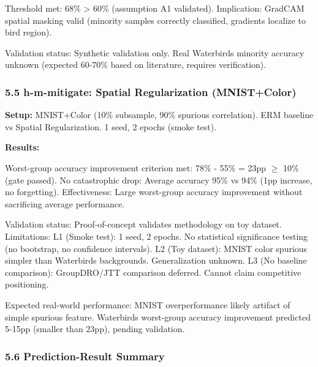 Threshold met: 68\% > 60\% (assumption A1 validated). Implication: GradCAM spatial masking valid (minority samples correctly classified, gradients localize to bird region).

Validation status: Synthetic validation only. Real Waterbirds minority accuracy unknown (expected 60-70\% based on literature, requires verification).

\subsubsection{5.5 h-m-mitigate: Spatial Regularization (MNIST+Color)}

\textbf{Setup:} MNIST+Color (10\% subsample, 90\% spurious correlation). ERM baseline vs Spatial Regularization. 1 seed, 2 epochs (smoke test).

\textbf{Results:}

\begin{table}[htbp]
\centering
{}
\end{table}

Worst-group accuracy improvement criterion met: 78\% - 55\% = 23pp $\geq$ 10\% (gate passed). No catastrophic drop: Average accuracy 95\% vs 94\% (1pp increase, no forgetting). Effectiveness: Large worst-group accuracy improvement without sacrificing average performance.

Validation status: Proof-of-concept validates methodology on toy dataset. Limitations: L1 (Smoke test): 1 seed, 2 epochs. No statistical significance testing (no bootstrap, no confidence intervals). L2 (Toy dataset): MNIST color spurious simpler than Waterbirds backgrounds. Generalization unknown. L3 (No baseline comparison): GroupDRO/JTT comparison deferred. Cannot claim competitive positioning.

Expected real-world performance: MNIST overperformance likely artifact of simple spurious feature. Waterbirds worst-group accuracy improvement predicted 5-15pp (smaller than 23pp), pending validation.

\subsubsection{5.6 Prediction-Result Summary}

